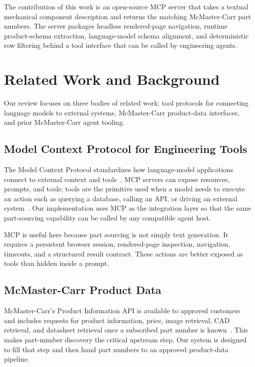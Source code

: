 \documentclass[colorlinks,upint,subscriptcorrection,varvw,hyphenate,balance,nofoot]{asmeconf}
\newcommand{\mcp}{MCP}
\begin{document}
The contribution of this work is an open-source \mcp{} server that takes a textual mechanical component description and returns the matching McMaster-Carr part numbers. The server packages headless rendered-page navigation, runtime product-schema extraction, language-model schema alignment, and deterministic row filtering behind a tool interface that can be called by engineering agents.

\section{Related Work and Background}

Our review focuses on three bodies of related work: tool protocols for connecting language models to external systems, McMaster-Carr product-data interfaces, and prior McMaster-Carr agent tooling.

\subsection{Model Context Protocol for Engineering Tools}

The Model Context Protocol standardizes how language-model applications connect to external context and tools~\cite{mcpspec}. MCP servers can expose resources, prompts, and tools; tools are the primitive used when a model needs to execute an action such as querying a database, calling an API, or driving an external system~\cite{mcptools}. Our implementation uses MCP as the integration layer so that the same part-sourcing capability can be called by any compatible agent host.

MCP is useful here because part sourcing is not simply text generation. It requires a persistent browser session, rendered-page inspection, navigation, timeouts, and a structured result contract. These actions are better exposed as tools than hidden inside a prompt.

\subsection{McMaster-Carr Product Data}

McMaster-Carr's Product Information API is available to approved customers and includes requests for product information, price, image retrieval, CAD retrieval, and datasheet retrieval once a subscribed part number is known~\cite{mcmasterapi}. This makes part-number discovery the critical upstream step. Our system is designed to fill that step and then hand part numbers to an approved product-data pipeline.
\end{document}
